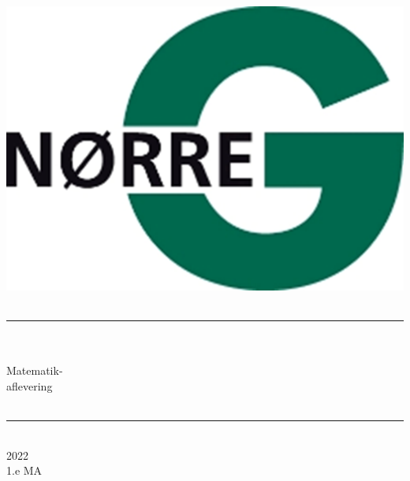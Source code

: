 \documentclass[12pt,x11names,a4paper]{article}
\begin{document}
%

\begin{titlepage}

\begin{minipage}{0.27\textwidth}

\end{minipage}
\begin{minipage}{0.73\textwidth}
\begin{center}
\phantom{h} \vspace{1cm}\\
\hspace{4cm}
\includegraphics[scale = 1]{Billeder/Norreg.png} \\
\phantom{h} \vspace{5cm}\\
\rule{0.7\textwidth}{0.3mm}\\
\phantom{h}\\
{\fontsize{50}{60}\selectfont Matematik-\\aflevering}\\
\phantom{h}\\
\rule{0.7\textwidth}{0.3mm}\\
\Large 2022\\
\Large 1.e MA

\end{center}
\end{minipage}
\end{titlepage}
\end{document}
